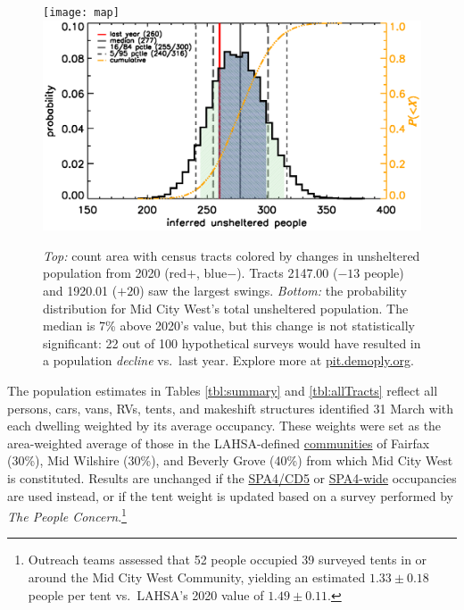 \documentclass[11pt]{article}
\begin{document}
\begin{figure}
	\centering
	\texttt{[image: map]}
	\includegraphics[width=\linewidth, trim = 0cm 0cm 0cm 0cm]{mcw2021Hist}
	\caption{{\it Top:} count area with census tracts colored by  
			changes in unsheltered population from 2020 (red$+$, blue$-$).
			Tracts 2147.00 ($-13$ people) and 1920.01 ($+20$) saw the largest swings. 
			{\it Bottom:} the probability distribution for Mid City West's total unsheltered 
			population. The median is 7\% above 2020's value, but this change is not 
			statistically significant: 22 out of 100 hypothetical surveys
			would have resulted in a population {\it decline} vs.~last year.
			Explore more at \href{https://pit.demoply.org}{pit.demoply.org}.}
	\label{fig:tcomp}
\end{figure} 

 The population estimates in Tables \ref{tbl:summary} and \ref{tbl:allTracts} 
reflect all persons, cars, vans, RVs, tents, and makeshift structures identified 31 March with each
dwelling weighted by its average occupancy. These weights were set as the area-weighted 
average of those in the LAHSA-defined 
\href{https://www.lahsa.org/documents?id=4686-2020-greater-los-angeles-city-community-homelessness-report-service-planning-area-4.pdf}{communities} of Fairfax (30\%), Mid Wilshire (30\%), and 
Beverly Grove (40\%) from which Mid City West is constituted. Results are unchanged if 
the \href{https://www.lahsa.org/documents?id=4635-usc-2018-2020-multipliers-and-estimates-overview}
{SPA4/CD5} or \href{https://www.lahsa.org/documents?id=4693-2020-greater-los-angeles-homeless-count-cvrtm-conversion-factors}{SPA4-wide} occupancies are used instead, or if the tent weight is 
updated based on a survey performed by {\it The People Concern}.\footnote{Outreach teams 
assessed that 52 people occupied 39 surveyed tents in or around the Mid City West Community,
yielding an estimated $1.33\pm0.18$ people per tent vs.~LAHSA's 2020 value of $1.49\pm0.11$.}
\end{document}
